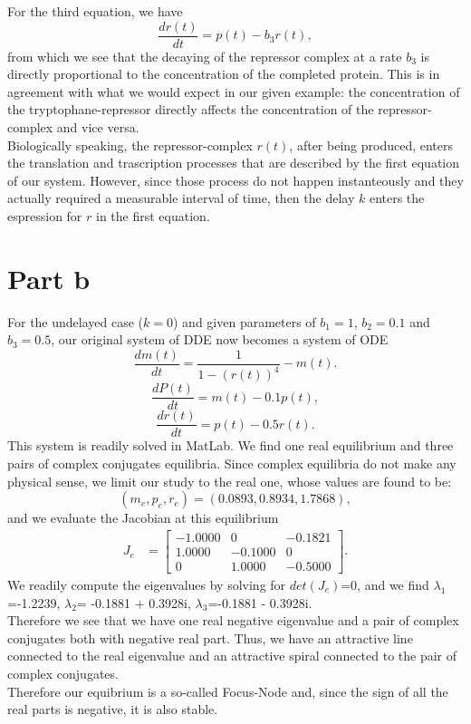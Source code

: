 For the third equation, we have
$$
\frac{dr(t)}{dt} = p(t) - b_{3}r(t),
$$  
from which we see that the decaying of the repressor complex at a rate $b_{3}$ is directly proportional to the concentration of the completed protein. This is in agreement with what we would expect in our given example: the concentration of the tryptophane-repressor directly affects the concentration of the repressor-complex and vice versa.\\
Biologically speaking, the repressor-complex $r(t)$, after being produced, enters the translation and trascription processes that are described by the first equation of our system. However, since those process do not happen instanteously and they actually required a measurable interval of time, then the delay $k$ enters the espression for $r$ in the first equation.

\section{Part b}

For the undelayed case ($k=0$) and given parameters of $b_{1}=1$, $b_{2}=0.1$ and $b_{3}=0.5$, our original system of DDE now becomes a system of ODE
$$
\frac{dm(t)}{dt} = \frac{1}{1-(r(t))^{4}} - m(t).
$$
$$
\frac{dP(t)}{dt} = m(t) - 0.1p(t),
$$
$$
\frac{dr(t)}{dt} = p(t) - 0.5r(t).
$$
This system is readily solved in MatLab. We find one real equilibrium and three pairs of complex conjugates equilibria. Since complex equilibria do not make any physical sense, we limit our study to the real one, whose values are found to be:
$$
(m_{e},p_{e},r_{e}) = (0.0893,0.8934,1.7868),
$$
and we evaluate the Jacobian at this equilibrium
\begin{align*}
J_{e}  &= \begin{bmatrix}
-1.0000 & 0 & -0.1821\\
1.0000 & -0.1000 & 0\\
0 & 1.0000 & -0.5000
\end{bmatrix}.
\end{align*}
We readily compute the eigenvalues by solving for $det(J_{e})$=0, and we find
$\lambda_{1}$=-1.2239, $\lambda_{2}$= -0.1881 + 0.3928i, $\lambda_{3}$=-0.1881 - 0.3928i.\\
Therefore we see that we have one real negative eigenvalue and a pair of complex conjugates both with negative real part. Thus, we have an attractive line connected to the real eigenvalue and an attractive spiral connected to the pair of complex conjugates.\\
Therefore our equibrium is a so-called Focus-Node and, since the sign of all the real parts is negative, it is also stable.

